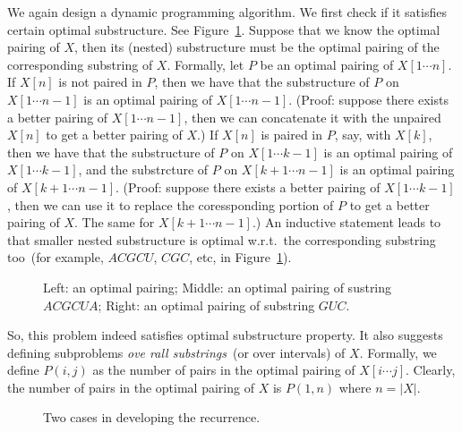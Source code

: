 We again design a dynamic programming algorithm.
We first check if it satisfies certain optimal substructure.
See Figure~\ref{fig:rna-optimal}.
Suppose that we know the optimal pairing of $X$,
then its (nested) substructure must be the optimal
pairing of the corresponding substring of $X$.
Formally, let $P$ be an optimal pairing of $X[1\cdots n]$.
If $X[n]$ is not paired in $P$, then we have that
the substructure of $P$ on $X[1\cdots n - 1]$ is an optimal
pairing of $X[1\cdots n - 1]$. (Proof: suppose there exists
a better pairing of $X[1\cdots n - 1]$, then we can concatenate
it with the unpaired $X[n]$ to get a better pairing of $X$.)
If $X[n]$ is paired in $P$, say, with $X[k]$, then we have that
the substructure of $P$ on $X[1\cdots k - 1]$ is an optimal
pairing of $X[1\cdots k - 1]$, and 
the substrcture of $P$ on $X[k + 1\cdots n - 1]$ is an optimal
pairing of $X[k + 1\cdots n - 1]$. 
(Proof: suppose there exists
a better pairing of $X[1\cdots k - 1]$, then we can use it to replace
the coressponding portion of $P$ to 
get a better pairing of $X$. The same for $X[k + 1\cdots n - 1]$.)
An inductive statement leads to that smaller nested substructure
is optimal w.r.t.\ the corresponding substring too~(for example, 
		$ACGCU$, $CGC$, etc, in Figure~\ref{fig:rna-optimal}).

\begin{figure}[h]
\centering{}
\caption{Left: an optimal pairing; Middle: an optimal pairing of sustring $ACGCUA$; Right: 
an optimal pairing of substring $GUC$.}
\label{fig:rna-optimal}
\end{figure}

So, this problem indeed satisfies optimal substructure property.
It also suggests defining subproblems \emph{ove rall substrings}~(or over intervals) of $X$.
Formally, we define $P(i,j)$ as the number of pairs in the optimal pairing of $X[i\cdots j]$.
Clearly, the number of pairs in the optimal pairing of $X$ is $P(1,n)$ where $n = |X|$.

\begin{figure}[b!]
\centering{}
\caption{Two cases in developing the recurrence.}
\label{fig:rna-recurrence}
\end{figure}


